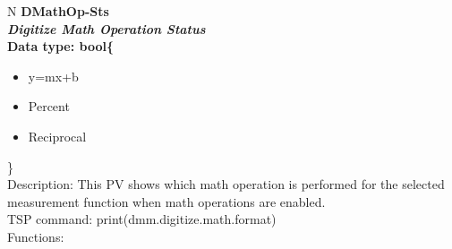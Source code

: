 \documentclass[openany]{article}
\begin{document}
		\begin{tabular}{N}
			\hline
			\bfseries DMathOp-Sts\label{pv:dmathop-sts} \\ \hline
			\emph{Digitize Math Operation Status} \\
			Data type: bool\{\begin{itemize}[noitemsep]
				\small
				\item[] y=mx+b
				\item[] Percent
				\item[] Reciprocal
			\end{itemize}\} \\
			Description: This PV shows which math operation is performed for the selected measurement function when math operations are enabled. \\
			TSP command: print(dmm.digitize.math.format) \\
			Functions: \\
			\arrayrulecolor{\FuncTableBorderColor}

		\end{tabular}
\end{document}
